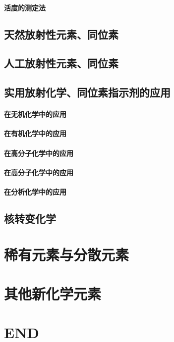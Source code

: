 \documentclass[UTF8]{../03-Chemistry}
\begin{document}
    \subsubsection{活度的测定法}
\section{天然放射性元素、同位素}
\section{人工放射性元素、同位素}
\section{实用放射化学、同位素指示剂的应用}
    \subsubsection{在无机化学中的应用}
    \subsubsection{在有机化学中的应用}
    \subsubsection{在高分子化学中的应用}
    \subsubsection{在高分子化学中的应用}
    \subsubsection{在分析化学中的应用}
\section{核转变化学}



\chapter{稀有元素与分散元素}


\chapter{其他新化学元素}


\chapter{END}
\end{document}
